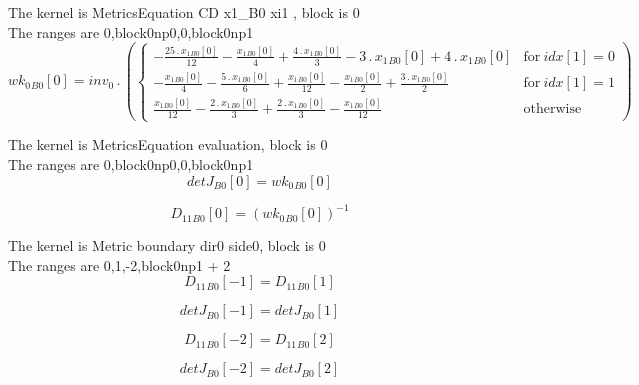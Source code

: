 \documentclass{article}
\begin{document}
\noindent The kernel is MetricsEquation CD x1_B0 xi1 , block is 0\\\noindent The ranges are 0,block0np0,0,block0np1\\\begin{dmath}{wk_{0}{_{B0}}}[{0}] = inv_0 \,.\, \left(\begin{cases} - \frac{25 \,.\, {x_{1}{_{B0}}}[{0}]}{12} - \frac{{x_{1}{_{B0}}}[{0}]}{4} + \frac{4 \,.\, {x_{1}{_{B0}}}[{0}]}{3} - 3 \,.\, {x_{1}{_{B0}}}[{0}] + 4 \,.\, {x_{1}{_{B0}}}[{0}] & 
\text{for}\: {idx}[{1}] = 0 \\- \frac{{x_{1}{_{B0}}}[{0}]}{4} - \frac{5 \,.\, {x_{1}{_{B0}}}[{0}]}{6} + \frac{{x_{1}{_{B0}}}[{0}]}{12} - \frac{{x_{1}{_{B0}}}[{0}]}{2} + \frac{3 \,.\, {x_{1}{_{B0}}}[{0}]}{2} & \text{for}\: {idx}[{1}] = 1 
\\\frac{{x_{1}{_{B0}}}[{0}]}{12} - \frac{2 \,.\, {x_{1}{_{B0}}}[{0}]}{3} + \frac{2 \,.\, {x_{1}{_{B0}}}[{0}]}{3} - \frac{{x_{1}{_{B0}}}[{0}]}{12} & \text{otherwise} \end{cases}\right)\end{dmath}

\noindent The kernel is MetricsEquation evaluation, block is 0\\\noindent The ranges are 0,block0np0,0,block0np1\\\begin{dmath}{detJ{_{B0}}}[{0}] = {wk_{0}{_{B0}}}[{0}]\end{dmath}

\begin{dmath}{D_{11}{_{B0}}}[{0}] = \left({wk_{0}{_{B0}}}[{0}] \right)^{-1}\end{dmath}

\noindent The kernel is Metric boundary dir0 side0, block is 0\\\noindent The ranges are 0,1,-2,block0np1 + 2\\\begin{dmath}{D_{11}{_{B0}}}[{-1}] = {D_{11}{_{B0}}}[{1}]\end{dmath}

\begin{dmath}{detJ{_{B0}}}[{-1}] = {detJ{_{B0}}}[{1}]\end{dmath}

\begin{dmath}{D_{11}{_{B0}}}[{-2}] = {D_{11}{_{B0}}}[{2}]\end{dmath}

\begin{dmath}{detJ{_{B0}}}[{-2}] = {detJ{_{B0}}}[{2}]\end{dmath}
\end{document}
